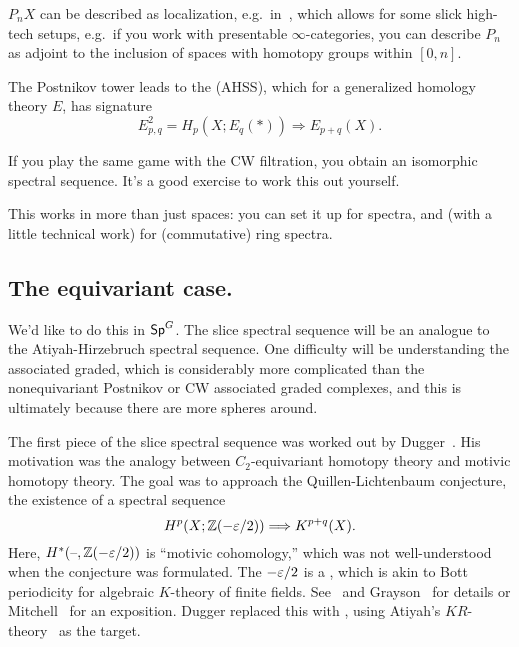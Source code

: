 $P_nX$ can be described as localization, e.g.\ in~\cite{MandellShipley}, which allows for some slick high-tech
setups, e.g.\ if you work with presentable $\infty$-categories, you can describe $P_n$ as adjoint to the inclusion
of spaces with homotopy groups within $[0,n]$.

The Postnikov tower leads to the  (AHSS), which for a generalized
homology theory $E$, has signature
\[E_{p,q}^2 = H_p(X; E_q(*))\Longrightarrow E_{p+q}(X).\]
\begin{ex}
If you play the same game with the CW filtration, you obtain an isomorphic spectral sequence. It's a good exercise
to work this out yourself.
\end{ex}
This works in more than just spaces: you can set it up for spectra, and (with a little technical work) for
(commutative) ring spectra.
\subsection*{The equivariant case.}
We'd like to do this in $\mathsf{Sp}^G$. The slice spectral sequence will be an analogue to the Atiyah-Hirzebruch spectral
sequence. One difficulty will be understanding the associated graded, which is considerably more complicated than
the nonequivariant Postnikov or CW associated graded complexes, and this is ultimately because there are more
spheres around.

The first piece of the slice spectral sequence was worked out by Dugger~\cite{DuggerKR}. His motivation was the
analogy between $C_2$-equivariant homotopy theory and motivic homotopy theory. 
The goal was to approach the Quillen-Lichtenbaum conjecture, the existence of a spectral sequence
\[H^p(X; \mathbb Z(-\varepsilon/2))\Longrightarrow K^{p+q}(X).\]
Here, $H^*(\text{--},\mathbb Z(-\varepsilon/2))$ is ``motivic cohomology,'' which was not well-understood when the conjecture was
formulated. The $-\varepsilon/2$ is a , which is akin to Bott periodicity for algebraic $K$-theory of
finite fields. See~ and Grayson~\cite{Grayson} for details or Mitchell~\cite{Mitchell}
for an exposition. Dugger replaced this with \TODO, using Atiyah's $\mathit{KR}$-theory~\cite{AtiyahKR} as the
target.

